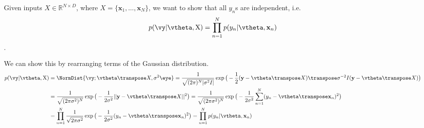 Given inputs $X\in\mathbb{R}^{N\times D}$, where $X=\{\textbf{x}_1, \dots, \textbf{x}_N\}$, we want to show that all $y_n$s are independent, i.e.
\begin{align}
p(\vy|\vtheta,\mat X) = \prod_{n=1}^N p(y_n|\vtheta,\textbf{x}_n)
\end{align}.

We can show this by rearranging terms of the Gaussian distribution.
\begin{align}
p(\vy|\vtheta,\mat X) &= \NormDist{\vy; \vtheta\transpose X, \sigma^2 \eye} = \frac{1}{\sqrt{(2\pi)^N|\sigma^2 I|}}\exp\big(-\frac{1}{2}(\textbf{y} - \vtheta\transpose X)\transpose\sigma^{-2}I (\textbf{y} - \vtheta\transpose X)\big) \\
&= \frac{1}{\sqrt{(2\pi\sigma^2)^N}}\exp\big(-\frac{1}{2\sigma^2}||\textbf{y} - \vtheta\transpose X||^2\big) = \frac{1}{\sqrt{(2\pi\sigma^2)^N}}\exp\big(-\frac{1}{2\sigma^2}\sum_{n=1}^N(y_n - \vtheta\transpose \textbf{x}_n)^2\big) \\
&= \prod_{n=1}^N \frac{1}{\sqrt{2\pi\sigma^2}}\exp\big(-\frac{1}{2\sigma^2}(y_n - \vtheta\transpose \textbf{x}_n)^2\big) = \prod_{n=1}^N p(y_n|\vtheta,\textbf{x}_n)
\end{align}
